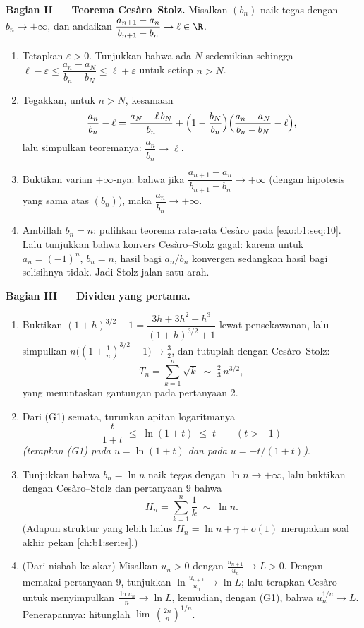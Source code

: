 \begin{problem}[{Soal akhir pekan --- teorema Cesàro--Stolz
dan asimtotik $u_n \sim \sqrt{3/n}$ untuk $u_{n+1} = \sin
u_n$}]
\medskip
\noindent\textbf{Bagian II --- Teorema Cesàro--Stolz.} Misalkan
$(b_n)$ naik tegas dengan $b_n \to +\infty$, dan
andaikan $\dfrac{a_{n+1} - a_n}{b_{n+1} - b_n} \to \ell \in \R$.
\begin{enumerate}[resume]
  \item Tetapkan $\varepsilon > 0$. Tunjukkan bahwa ada $N$ sedemikian sehingga
        $\ell - \varepsilon \leq \dfrac{a_n - a_N}{b_n - b_N}
        \leq \ell + \varepsilon$ untuk setiap $n > N$.
  \item Tegakkan, untuk $n > N$, kesamaan
        \[
        \frac{a_n}{b_n} - \ell
        = \frac{a_N - \ell\,b_N}{b_n}
        + \Bigl(1 - \frac{b_N}{b_n}\Bigr)
        \Bigl(\frac{a_n - a_N}{b_n - b_N} - \ell\Bigr),
        \]
        lalu simpulkan teoremanya: $\dfrac{a_n}{b_n} \to \ell$.
  \item Buktikan varian $+\infty$-nya: bahwa jika $\dfrac{a_{n+1} -
        a_n}{b_{n+1} - b_n} \to +\infty$ (dengan hipotesis yang sama atas
        $(b_n)$), maka $\dfrac{a_n}{b_n} \to +\infty$.
  \item Ambillah $b_n = n$: pulihkan teorema rata-rata Cesàro pada
        \cref{exo:b1:seq:10}. Lalu tunjukkan bahwa konvers
        Cesàro--Stolz gagal: karena untuk $a_n = (-1)^n$, $b_n = n$,
        hasil bagi $a_n/b_n$ konvergen sedangkan hasil bagi
        selisihnya tidak. Jadi Stolz jalan satu arah.
\end{enumerate}

\medskip
\noindent\textbf{Bagian III --- Dividen yang pertama.}
\begin{enumerate}[resume]
  \item Buktikan $(1+h)^{3/2} - 1 = \dfrac{3h + 3h^2 +
        h^3}{(1+h)^{3/2} + 1}$ lewat pensekawanan, lalu simpulkan
        $n\bigl((1 + \tfrac1n)^{3/2} - 1\bigr) \to \tfrac32$,
        dan tutuplah dengan Cesàro--Stolz:
        \[
        T_n = \sum_{k=1}^{n} \sqrt k \;\sim\; \tfrac23\,
        n^{3/2} ,
        \]
        yang menuntaskan gantungan pada pertanyaan 2.
  \item Dari (G1) semata, turunkan apitan logaritmanya
        \[
        \frac{t}{1 + t} \;\leq\; \ln(1 + t) \;\leq\; t
        \qquad (t > -1)
        \]
        \emph{(terapkan (G1) pada $u = \ln(1+t)$ dan pada $u =
        -t/(1+t)$)}.
  \item Tunjukkan bahwa $b_n = \ln n$ naik tegas dengan
        $\ln n \to +\infty$, lalu buktikan dengan Cesàro--Stolz dan
        pertanyaan 9 bahwa
        \[
        H_n = \sum_{k=1}^{n} \frac 1k \;\sim\; \ln n .
        \]
        (Adapun struktur yang lebih halus $H_n = \ln n + \gamma + o(1)$ merupakan
        soal akhir pekan \cref{ch:b1:series}.)
  \item (Dari nisbah ke akar) Misalkan $u_n > 0$ dengan
        $\frac{u_{n+1}}{u_n} \to L > 0$. Dengan memakai pertanyaan 9, tunjukkan
        $\ln\frac{u_{n+1}}{u_n} \to \ln L$; lalu terapkan Cesàro untuk
        menyimpulkan $\frac{\ln u_n}{n} \to \ln L$, kemudian, dengan (G1),
        bahwa $u_n^{1/n} \to L$. Penerapannya: hitunglah
        $\lim\,\binom{2n}{n}^{1/n}$.
\end{enumerate}


\end{problem}
